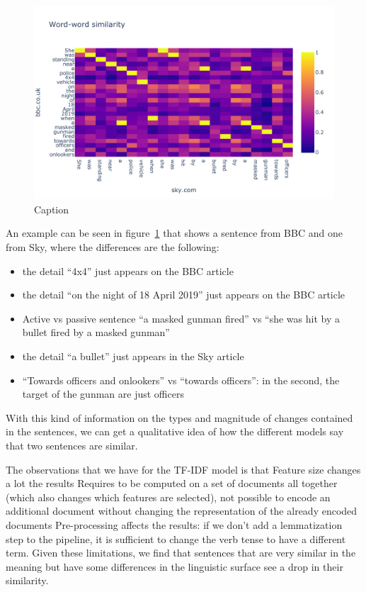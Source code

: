 \begin{figure}[!htb]
    \centering
    \includegraphics[width=\linewidth]{figures/lyra.pdf}
    \caption{Caption}
    \label{fig:lyra}
\end{figure}

An example can be seen in figure~\ref{fig:lyra} that shows a sentence from BBC and one from Sky, where the differences are the following:

\begin{itemize}
    \item the detail ``4x4'' just appears on the BBC article
    \item the detail ``on the night of 18 April 2019'' just appears on the BBC article
    \item Active vs passive sentence ``a masked gunman fired'' vs ``she was hit by a bullet fired by a masked gunman''
    \item the detail ``a bullet'' just appears in the Sky article
    \item ``Towards officers and onlookers'' vs ``towards officers'': in the second, the target of the gunman are just officers
\end{itemize}

With this kind of information on the types and magnitude of changes contained in the sentences, we can get a qualitative idea of how the different models say that two sentences are similar.


The observations that we have for the TF-IDF model is that
Feature size changes a lot the results
Requires to be computed on a set of documents all together (which also changes which features are selected), not possible to encode an additional document without changing the representation of the already encoded documents
Pre-processing affects the results: if we don’t add a lemmatization step to the pipeline, it is sufficient to change the verb tense to have a different term.
Given these limitations, we find that sentences that are very similar in the meaning but have some differences in the linguistic surface see a drop in their similarity.


